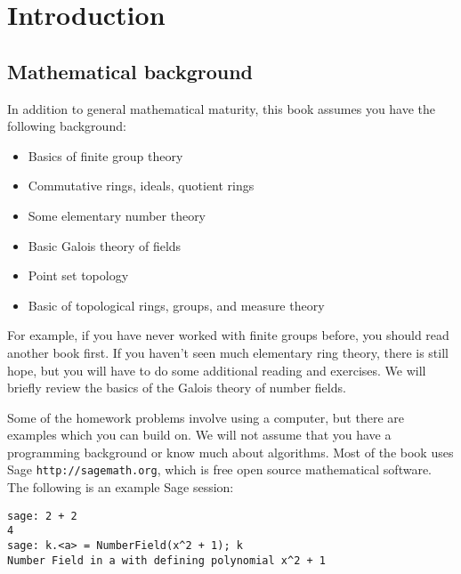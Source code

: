 \chapter{Introduction}

\section{Mathematical background}
In addition to general mathematical maturity, 
this book assumes you have the following background:
\begin{itemize}\setlength{\itemsep}{-.7ex}
\item Basics of finite group theory
\item Commutative rings, ideals, quotient rings
\item Some elementary number theory
\item Basic Galois theory of fields
\item Point set topology
\item Basic of topological rings, groups, and measure theory
\end{itemize}
For example, if you have never worked with finite groups before, you
should read another book first. If you haven't seen much elementary
ring theory, there is still hope, but you will have to do some
additional reading and exercises.  We will briefly review the basics of
the Galois theory of number fields.

Some of the homework problems involve using a computer, but there
are examples which you can build on.  We will not assume that you have
a programming background or know much about algorithms. Most
of the book uses Sage {\tt http://sagemath.org}, which is
free open source mathematical software.  The following is an example
Sage session:
\begin{verbatim}
sage: 2 + 2
4 
sage: k.<a> = NumberField(x^2 + 1); k
Number Field in a with defining polynomial x^2 + 1
\end{verbatim}

